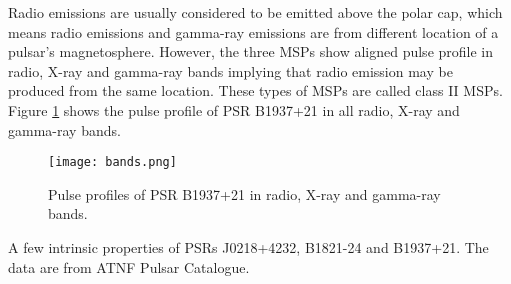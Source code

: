 \documentclass[12pt]{report}
\newcommand{\mycaption}[1]{\protect \caption{#1}}
\begin{document}
    Radio emissions are usually considered to be emitted above the polar cap, which means
    radio emissions and gamma-ray emissions are from different location of a pulsar's 
    magnetosphere. However, the three MSPs show aligned pulse profile in radio, X-ray and 
    gamma-ray bands implying that radio emission may be produced from the same location. 
    These types of MSPs are called class II MSPs.
    \citep{0004-637X-787-2-167} Figure \ref{fig:class } shows the pulse profile of PSR 
    B1937+21 in all radio, X-ray and gamma-ray bands. 
    \begin{figure}[!htp]   
      \centering
      \texttt{[image: bands.png]}
      \caption{Pulse profiles of PSR B1937+21 in radio, X-ray and gamma-ray bands.
        \citep{0004-637X-787-2-167}}
      \label{fig:class }
    \end{figure}
    
    \begin{table}[!htp]
      \centering
      \centering
      \mycaption{A few intrinsic properties of PSRs J0218+4232, B1821-24 and B1937+21. 
        The data are from ATNF Pulsar Catalogue. \citep{ATNF}}
      \label{table: basic_information_3_msps}
    \end{table}
\end{document}
